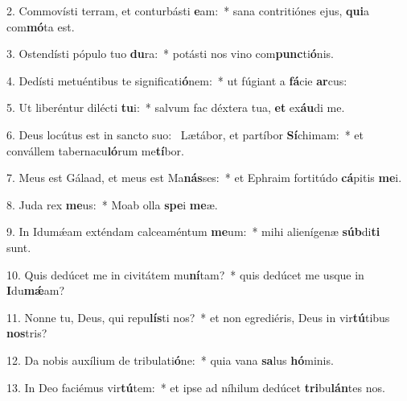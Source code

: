 2. Commovísti terram, et conturbásti \textbf{e}am:~*  sana contritiónes ejus, \textbf{qui}a com\textbf{mó}ta est.\

3. Ostendísti pópulo tuo \textbf{du}ra:~*  potásti nos vino com\textbf{punc}ti\textbf{ó}nis.\

4. Dedísti metuéntibus te significati\textbf{ó}nem:~*  ut fúgiant a \textbf{fá}cie \textbf{ar}cus:\

5. Ut liberéntur dilécti \textbf{tu}i:~*  salvum fac déxtera tua, \textbf{et} ex\textbf{áu}di me.\

6. Deus locútus est in sancto suo: \dag\  Lætábor, et partíbor \textbf{Sí}chimam:~*  et convállem tabernacu\textbf{ló}rum me\textbf{tí}bor.\

7. Meus est Gálaad, et meus est Ma\textbf{nás}ses:~*  et Ephraim fortitúdo \textbf{cá}pitis \textbf{me}i.\

8. Juda rex \textbf{me}us:~*  Moab olla \textbf{spe}i \textbf{me}æ.\

9. In Idumǽam exténdam calceaméntum \textbf{me}um:~*  mihi alienígenæ \textbf{súb}di\textbf{ti} sunt.\

10. Quis dedúcet me in civitátem mu\textbf{ní}tam?~*  quis dedúcet me usque in \textbf{I}du\textbf{mǽ}am?\

11. Nonne tu, Deus, qui repu\textbf{lís}ti nos?~*  et non egrediéris, Deus in vir\textbf{tú}tibus \textbf{nos}tris?\

12. Da nobis auxílium de tribulati\textbf{ó}ne:~*  quia vana \textbf{sa}lus \textbf{hó}minis.\

13. In Deo faciémus vir\textbf{tú}tem:~*  et ipse ad níhilum dedúcet \textbf{tri}bu\textbf{lán}tes nos.\

